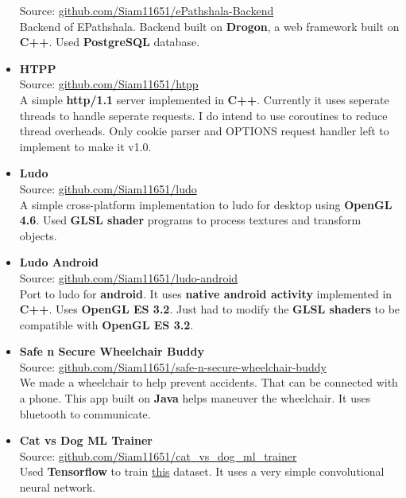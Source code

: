 \begin{itemize}
{    Source: \href{https://github.com/Siam11651/ePathshala-Backend}{github.com/Siam11651/ePathshala-Backend} \\
    Backend of EPathshala. Backend built on \textbf{Drogon}, a web framework built on \textbf{C++}. Used \textbf{PostgreSQL} database.
  }
  \item {
    \textbf{HTPP} \\
    Source: \href{https://github.com/Siam11651/htpp}{github.com/Siam11651/htpp} \\
    A simple \textbf{http/1.1} server implemented in \textbf{C++}. Currently it uses seperate threads to handle seperate requests. I do intend to use coroutines to reduce thread overheads. Only cookie parser and OPTIONS request handler left to implement to make it v1.0.
  }
  \item {
    \textbf{Ludo} \\
    Source: \href{https://github.com/Siam11651/ludo}{github.com/Siam11651/ludo} \\
    A simple cross-platform implementation to ludo for desktop using \textbf{OpenGL 4.6}. Used \textbf{GLSL shader} programs to process textures and transform objects.
  }
  \item {
    \textbf{Ludo Android} \\
    Source: \href{https://github.com/Siam11651/ludo-android}{github.com/Siam11651/ludo-android} \\
    Port to ludo for \textbf{android}. It uses \textbf{native android activity} implemented in \textbf{C++}. Uses \textbf{OpenGL ES 3.2}. Just had to modify the \textbf{GLSL shaders} to be compatible with \textbf{OpenGL ES 3.2}.
  }
  \item {
    \textbf{Safe n Secure Wheelchair Buddy} \\
    Source: \href{https://github.com/Siam11651/safe-n-secure-wheelchair-buddy}{github.com/Siam11651/safe-n-secure-wheelchair-buddy} \\
    We made a wheelchair to help prevent accidents. That can be connected with a phone. This app built on \textbf{Java} helps maneuver the wheelchair. It uses bluetooth to communicate.
  }
  \item {
      \textbf{Cat vs Dog ML Trainer} \\
      Source: \href{https://github.com/Siam11651/cat_vs_dog_ml_trainer}{github.com/Siam11651/cat\_vs\_dog\_ml\_trainer} \\
      Used \textbf{Tensorflow} to train \href{https://www.kaggle.com/competitions/dogs-vs-cats}{this} dataset. It uses a very simple convolutional neural network.
}
\end{itemize}
